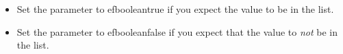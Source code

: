 \begin{itemize}
\item Set the parameter to \app{}efbooleantrue{} if you expect the value to be in the list. 
\item Set the parameter to \app{}efbooleanfalse{} if you expect that the value to \emph{not} be in the list.
\end{itemize}

    